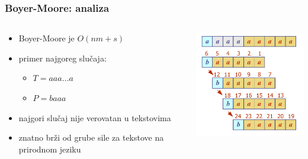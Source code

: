 \documentclass[compress]{beamer}
\begin{document}
\begin{frame}[fragile]
  \frametitle{Boyer-Moore: analiza}
  \begin{columns}
    \begin{column}[t]{6cm}
      \begin{itemize}
        \item Boyer-Moore je $O(nm+s)$
        \item primer najgoreg slučaja:
        \begin{itemize}
          \item $T = aaa \ldots a$
          \item $P = baaa$
        \end{itemize}
        \item najgori slučaj nije verovatan u tekstovima
        \item znatno brži od grube sile za tekstove na prirodnom jeziku
      \end{itemize}
    \end{column}
    \begin{column}[t]{6cm}
      \begin{center}
        \includegraphics[width=6cm]{asp-13-pic04.png}
      \end{center}
    \end{column}
  \end{columns}
\end{frame}
\end{document}
